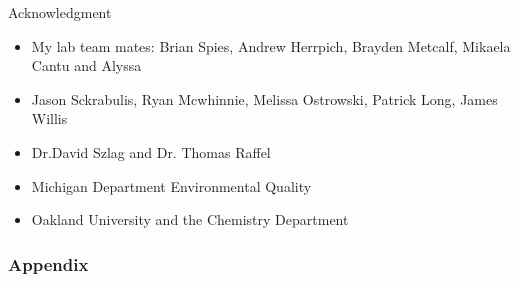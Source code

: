 \begin{frame}{Acknowledgment}

	\begin{itemize} 
		\item My lab team mates: Brian Spies, Andrew Herrpich, Brayden Metcalf, Mikaela Cantu and Alyssa
		\item Jason Sckrabulis, Ryan Mcwhinnie, Melissa Ostrowski, Patrick Long, James Willis
		\item Dr.David Szlag and Dr. Thomas Raffel
		\item Michigan Department Environmental Quality
		\item Oakland University and the Chemistry Department
	\end{itemize}

\end{frame}

\begin{frame}
	\frametitle{Appendix}

	

\end{frame}


